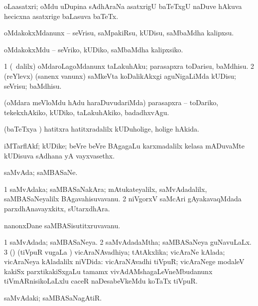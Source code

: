 \bentry
{}
\gl{\nA}
\bmng
oLaasatxri; oMdu uDupina sAdhAraNa asatxrigU baTeTxgU naDuve hAkuva hecicxna asatxrige baLasuva baTeTx. 
\emng
\eentry

\bentry
{}
\gl{\sakirx}
\bmng
oMdakokxMdanunx -- seVrisu, saMpakiRsu, kUDisu, saMbaMdha kalipxsu. 
\emng

\noindent
\gl{\akirx}
\bmng
oMdakokxMdu -- seVriko, kUDiko, saMbaMdha kalipxsiko. 
\emng
\eentry

\bentry
{}
\gl{\sakirx}
\bmng
\bnum
\num{1} (\sA\ \kaparx dalilx) oMdaroLagoMdanunx taLakuhAku; parasapxra toDarisu, baMdhisu. 
\num{2} (reYlevx) (sanenx \mo vanunx) saMkeVta koDalikAkxgi aguNigaLiMda kUDisu; seVrisu; baMdhisu. 
\enum
\emng

\noindent
\gl{\akirx}
\bmng
(oMdara meVloMdu hAdu haraDuvudariMda) parasapxra -- toDariko, tekekxhAkiko, kUDiko, taLakuhAkiko, badadhxvAgu. 
\emng
\eentry

\bentry
{}
\gl{\gu}
\bmng
(baTeTxya \vi) hatitxra hatitxradalilx kUDuholige, holige hAkida. 
\emng
\eentry

\bentry
{}
\gl{\nA}
\bmng
iMTarflAkf; kUDike; beVre beVre BAgagaLu karxmadalilx kelasa mADuvaMte kUDisuva sAdhana yA vayxvasethx. 
\emng
\eentry

\bentry
{}
\gl{\nA}
\bmng
saMvAda; saMBASaNe. 
\emng
\eentry

\bentry
{}
\gl{\nA}
\bmng
\bnum
\num{1} saMvAdaka; saMBASaNakAra; mAtukateyalilx, saMvAdadalilx, saMBASaNeyalilx BAgavahisuvavanu. 
\num{2} niVgorxV saMcAri gAyakavaqMdada parxdhAnavayxkitx, sUtarxdhAra. 
\enum
\emng

\noindent
\gl{\pagu}
\bmng
{} nanonxDane saMBASisutitxruvavanu. 
\emng
\eentry

\bentry
{}
\gl{\gu}
\bmng
\bnum
\num{1} saMvAdada; saMBASaNeya. 
\num{2} saMvAdadaMtha; saMBASaNeya guNavuLaLx. 
\num{3} (\nAyxshA) (tiVpuR \mo vugaLa \vi) vicAraNAvadhiya; tAtAkxlika; vicAraNe kAlada; vicAraNeya kAladalilx niVDida:  vicAraNAvadhi tiVpuR; vicAraNege modaleV kakiSx parxtikakiSxgaLu tamamx vivAdAMshagaLeVneMbudanunx tiVmARnisikoLaLxlu caceR naDesabeVkeMdu koTaTx tiVpuR. 
\enum
\emng
\eentry

\bentry
{}
\gl{\nA}
\bmng
saMvAdaki; saMBASaNagAtiR. 
\emng
\eentry

